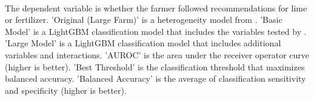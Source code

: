 \begin{table}[H] \centering
{}

\caption{Model Results Comparison: Lime}
\\ \parbox{0.79\linewidth}{\tiny The dependent variable is whether the farmer followed recommendations for lime or fertilizer. 'Original (Large Farm)' is a heterogeneity model from \textcite{fabregas_digital_2025}. 'Basic Model' is a LightGBM classification model that includes the variables tested by \textcite{fabregas_digital_2025}. 'Large Model'  is a LightGBM classification model that includes additional variables and interactions. 'AUROC' is the area under the receiver operator curve (higher is better). 'Best Threshold' is the classification threshold that maximizes balanced accuracy. 'Balanced Accuracy' is the average of classification sensitivity and specificity (higher is better).}
\end{table}
